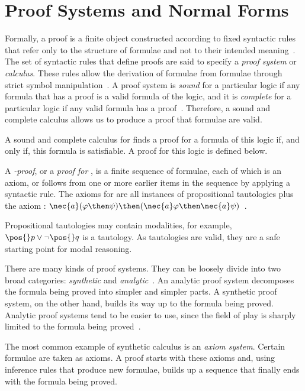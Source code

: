 \section{Proof Systems and Normal Forms}

Formally, a proof is a finite object constructed according to fixed syntactic
rules that refer only to the structure of formulae and not to their intended
meaning~\cite{fitting}. The set of syntactic rules that define proofs are said
to specify a \emph{proof system} or \emph{calculus}. These rules allow the
derivation of formulae from formulae through strict symbol
manipulation~\cite{resolutionbased}. A proof system is \emph{sound} for a
particular logic if any formula that has a proof is a valid formula of the
logic, and it is \emph{complete} for a particular logic if any valid formula has
a proof~\cite{fitting}. Therefore, a sound and complete calculus allows us to
produce a proof that formulae are valid. 

A sound and complete calculus for  finds a proof for a formula of
this logic if, and only if, this formula is satisfiable. A proof for this
logic is defined below.

\begin{definition}%
\label{def:kproof}
    A \emph{-proof}, or a \emph{proof for }, is a
    finite sequence of formulae, each of which is an axiom, or follows from one
    or more earlier items in the sequence by applying a syntactic rule. The
    axioms for  are all instances of propositional tautologies
    plus the axiom  : $\nec{a}(\varphi \then \psi) \then (\nec{a}
    \varphi \then \nec{a} \psi)$~\cite{blackburn2002modal}.
\end{definition}

Propositional tautologies may contain modalities, for example, $\pos{}p \lor
\neg \pos{} q$ is a tautology. As tautologies are valid, they are a safe
starting point for modal reasoning. 

There are many kinds of proof systems. They can be loosely divide into two broad
categories: \emph{synthetic} and \emph{analytic}~\cite{fitting}. An analytic
proof system decomposes the formula being proved into simpler and simpler parts.
A synthetic proof system, on the other hand, builds its way up to the formula being
proved. Analytic proof systems tend to be easier to use, since the field of
play is sharply limited to the formula being proved~\cite{fitting}. 

The most common example of synthetic calculus is an \emph{axiom system}. Certain
formulae are taken as axioms. A proof starts with these axioms and, using
inference rules that produce new formulae, builds up a sequence that finally
ends with the formula being proved.

